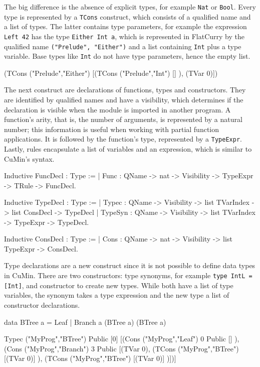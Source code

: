 \documentclass[paper = a4, fleqn, abstract=on, twoside]{scrreprt}
\newcommand{\coqinline}[1]{\texttt{#1}}
\begin{document}
The big difference is the absence of explicit types, for example \texttt{Nat} or \texttt{Bool}.  Every type is represented by a \coqinline{TCons} construct, which consists of a qualified name and a list of types. The latter contains type parameters, for example the expression \texttt{Left 42} has the type \texttt{Either Int a}, which is represented in FlatCurry by the qualified name \texttt{("Prelude", "Either")} and a list containing \texttt{Int} plus a type variable. Base types like \texttt{Int} do not have type parameters,  hence the empty list.
\begin{coqcode}
(TCons ("Prelude","Either") [(TCons ("Prelude","Int") [] ), (TVar 0)])
\end{coqcode}
The next construct are declarations of functions, types and constructors. They are identified by qualified names and have a visibility, which determines if the declaration is visible when the module is imported in another program. A function's arity, that is, the number of arguments, is represented by a natural number; this information is useful when working with partial function applications. It is followed by the function's type, represented by a \coqinline{TypeExpr}. Lastly, rules encapsulate a list of variables and an expression, which is similar to CuMin's syntax.
\begin{coqcode}
Inductive FuncDecl : Type := 
  | Func : QName -> nat -> Visibility -> TypeExpr -> TRule -> FuncDecl.

Inductive TypeDecl : Type :=
  | Typec   : QName -> Visibility -> list TVarIndex -> list ConsDecl -> TypeDecl
  | TypeSyn : QName -> Visibility -> list TVarIndex -> TypeExpr      -> TypeDecl.
  
Inductive ConsDecl : Type :=
  | Cons :  QName -> nat -> Visibility -> list TypeExpr -> ConsDecl.
\end{coqcode}
Type declarations are a new construct since it is not possible to define data types in CuMin. There are two constructors: type synonyms, for example \texttt{type IntL = [Int]}, and constructor to create new types. While both have a list of type variables, the synonym takes a type expression and the new type a list of constructor declarations.
\begin{coqcode}
data BTree a = Leaf | Branch a (BTree a) (BTree a)

Typec ("MyProg","BTree") Public  [0]  
[(Cons ("MyProg","Leaf") 0 Public  [] ), (Cons ("MyProg","Branch") 3 Public
                                           [(TVar 0), 
                                            (TCons ("MyProg","BTree") [(TVar 0)] ), 
                                            (TCons ("MyProg","BTree") [(TVar 0)] )])]
\end{coqcode}
\end{document}

